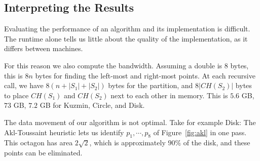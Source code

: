 %
%
%
%
%
%
%

\subsection{Interpreting the Results}

Evaluating the performance of an algorithm and its implementation is difficult.
The runtime alone tells us little about the quality of the implementation, as
it differs between machines.

For this reason we also compute the bandwidth. Assuming a double is $8$ bytes,
this is $8n$ bytes for finding the left-most and right-most points. At each
recursive call, we have $8(n + |S_1| + |S_2|)$ bytes for the partition,
and $8|CH(S_2)|$ bytes to place $CH(S_1)$ and $CH(S_2)$ next to each other in
memory. This is $5.6$ GB, $73$ GB, $7.2$ GB for Kuzmin, Circle, and Disk.

The data movement of our algorithm is not optimal. Take for example Disk:
The Akl-Toussaint heuristic \cite{akl78} lets us identify $p_1, \cdots, p_8$
of Figure~\ref{fig:akl} in one pass. This octagon has area $2\sqrt{2}$,
which is approximately $90\%$ of the disk, and these points can be eliminated.

